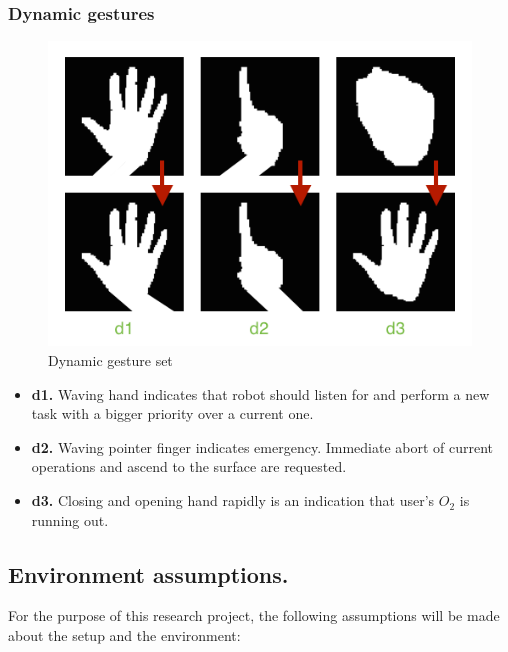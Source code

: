 \documentclass[a4paper,11pt,oneside]{article}
\begin{document}
\subsubsection{Dynamic gestures}

\begin{figure}[H]
\centering
\includegraphics[scale=0.6]{dynamic-gestureset.png}
\caption{Dynamic gesture set}
\end{figure}

\begin{itemize}
  \item \textbf{d1.} Waving hand indicates that robot should listen for and perform a new task with a bigger priority over a current one.
  \item \textbf{d2.} Waving pointer finger indicates emergency. Immediate abort of current operations and ascend to the surface are requested.
  \item \textbf{d3.} Closing and opening hand rapidly is an indication that user's $O_2$ is running out.
  \end{itemize}

\subsection{Environment assumptions.}

For the purpose of this research project, the following assumptions will be made about the setup and the environment:\\
\end{document}
